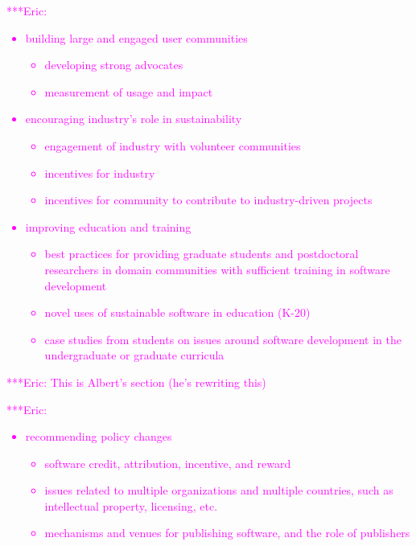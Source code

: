 \documentclass[11pt, oneside]{amsart}
\newcommand{\huttonnote}[1]{ {\textcolor{magenta}    { ***Eric:      #1 }}}
\begin{document}
\huttonnote{
\begin{itemize}
\item building large and engaged user communities
  \begin{itemize}
  \item developing strong advocates
  \item measurement of usage and impact
  \end{itemize}
\item encouraging industry's role in sustainability
  \begin{itemize}
  \item engagement of industry with volunteer communities
  \item incentives for industry
  \item incentives for community to contribute to industry-driven projects
  \end{itemize}
\item improving education and training
  \begin{itemize}
  \item best practices for providing graduate students and postdoctoral
        researchers in domain communities with sufficient training in
        software development
  \item novel uses of sustainable software in education (K-20)
  \item case studies from students on issues around software development in
        the undergraduate or graduate curricula
  \end{itemize}
\end{itemize}
}

\huttonnote{This is Albert's section (he's rewriting this)}

\huttonnote{
\begin{itemize}
\item recommending policy changes
  \begin{itemize}
  \item software credit, attribution, incentive, and reward
  \item issues related to multiple organizations and multiple countries, such
        as intellectual property, licensing, etc.
  \item mechanisms and venues for publishing software, and the role of
        publishers
  \end{itemize}
\end{itemize}
}
\end{document}
